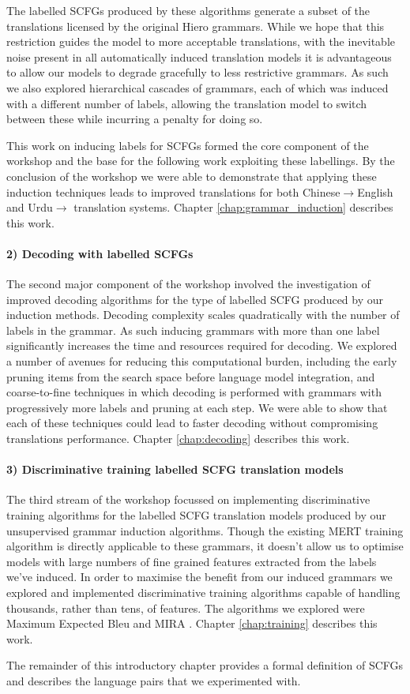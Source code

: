 The labelled SCFGs produced by these algorithms generate a subset of the translations licensed by the original Hiero grammars.
While we hope that this restriction guides the model to more acceptable translations, with the inevitable noise present in all automatically induced translation models it is advantageous to allow our models to degrade gracefully to less restrictive grammars.
As such we also explored hierarchical cascades of grammars, each of which was induced with a different number of labels, allowing the translation model to switch between these while incurring a penalty for doing so.

This work on inducing labels for SCFGs formed the core component of the workshop and the base for the following work exploiting these labellings. 
By the conclusion of the workshop we were able to demonstrate that applying these induction techniques leads to improved translations for both Chinese$\rightarrow$English and Urdu$\rightarrow$ translation systems.
Chapter \ref{chap:grammar_induction} describes this work.

\paragraph{2) Decoding with labelled SCFGs}
The second major component of the workshop involved the investigation of improved decoding algorithms for the type of labelled SCFG produced by our induction methods.
Decoding complexity scales quadratically with the number of labels in the grammar.
As such inducing grammars with more than one label significantly increases the time and resources required for decoding.
We explored a number of avenues for reducing this computational burden, including the early pruning items from the search space before language model integration, and coarse-to-fine techniques in which decoding is performed with grammars with progressively more labels and pruning at each step.
We were able to show that each of these techniques could lead to faster decoding without compromising translations performance.
Chapter \ref{chap:decoding} describes this work.

\paragraph{3) Discriminative training labelled SCFG translation models}
The third stream of the workshop focussed on implementing discriminative training algorithms for the labelled SCFG translation models produced by our unsupervised grammar induction algorithms.
Though the existing MERT \cite{och02mert} training algorithm is directly applicable to these grammars, it doesn't allow us to optimise models with large numbers of fine grained features extracted from the labels we've induced.
In order to maximise the benefit from our induced grammars we explored and implemented discriminative training algorithms capable of handling thousands, rather than tens, of features.
The algorithms we explored were Maximum Expected Bleu \cite{smith,li} and MIRA \cite{chiang}.
Chapter \ref{chap:training} describes this work.

The remainder of this introductory chapter provides a formal definition of SCFGs and describes the language pairs that we experimented with.
